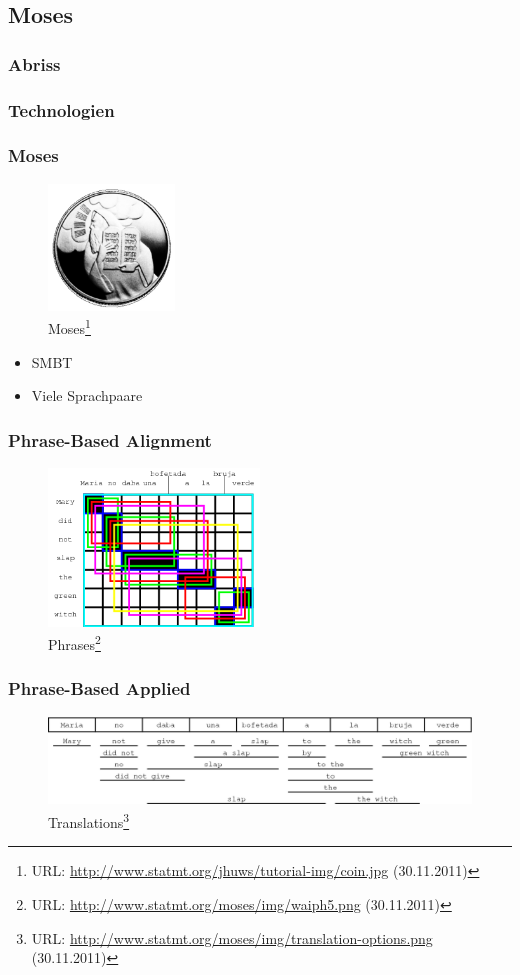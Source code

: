 \documentclass{beamer}
\begin{document}
\subsection{Moses}
\subsubsection{Abriss}
\subsubsection{Technologien}
\begin{frame}
  \frametitle{Moses}
  \begin{figure}
  \includegraphics[width=0.30\textwidth]{graphics/moses}
  \caption{Moses\footnote{URL:
      \url{http://www.statmt.org/jhuws/tutorial-img/coin.jpg} (30.11.2011)}}
  \end{figure}
  \begin{itemize}
    \item SMBT
    \item Viele Sprachpaare
  \end{itemize}
\end{frame}
\begin{frame}
  \frametitle{Phrase-Based Alignment}
  \begin{figure}
  \includegraphics[width=0.50\textwidth]{graphics/phrases}
  \caption{Phrases\footnote{URL:
      \url{http://www.statmt.org/moses/img/waiph5.png} (30.11.2011)}}
  \end{figure}
\end{frame}
\begin{frame}
  \frametitle{Phrase-Based Applied}
  \begin{figure}
  \includegraphics[width=1.00\textwidth]{graphics/translationoptions}
  \caption{Translations\footnote{URL:
      \url{http://www.statmt.org/moses/img/translation-options.png} (30.11.2011)}}
  \end{figure}
\end{frame}
\end{document}
